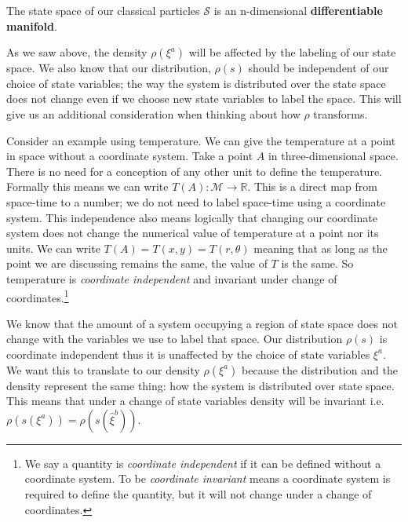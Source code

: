 \documentclass{article}
\begin{document}
\begin{prop}
	The state space of our classical particles $\mathcal{S}$ is an n-dimensional \textbf{differentiable manifold}.
\end{prop}


	 As we saw above, the density $\rho(\xi^a)$ will be affected by the labeling of our state space. We also know that our distribution, $\rho(s)$ should be independent of our choice of state variables; the way the system is distributed over the state space does not change even if we choose new state variables to label the space.  This will give us an additional consideration when thinking about how $\rho$ transforms. 
	 
	 Consider an example using temperature. We can give the temperature at a point in space without a coordinate system. Take a point $A$ in three-dimensional space. There is no need for a conception of any other unit to define the temperature. Formally this means we can write $T(A): \mathcal{M} \to \mathbb{R}$. This is a direct map from space-time to a number; we do not need to label space-time using a coordinate system. This independence also means logically that changing our coordinate system does not change the numerical value of temperature at a point nor its units. We can write $T(A) = T(x,y) = T(r,\theta)$ meaning that as long as the point we are discussing remains the same, the value of $T$ is the same. So temperature is \textit{coordinate independent} and invariant under change of coordinates.\footnote{We say a quantity is \textit{coordinate independent} if it can be defined without a  coordinate system. To be \textit{coordinate invariant} means a coordinate system is required to define the quantity, but it will not change under a change of coordinates.}
	 
 
	We know that the amount of a system occupying a region of state space does not change with the variables we use to label that space. Our distribution $\rho(s)$ is coordinate independent thus it is unaffected  by the choice of state variables $\xi^a$. We want this to translate to our density $\rho(\xi^a)$ because the distribution and the density represent the same thing: how the system is distributed over state space. This means that under a change of state variables density will be invariant i.e. $\rho(s(\xi^a)) = \rho(s(\hat{\xi}^b))$.
	
\end{document}
